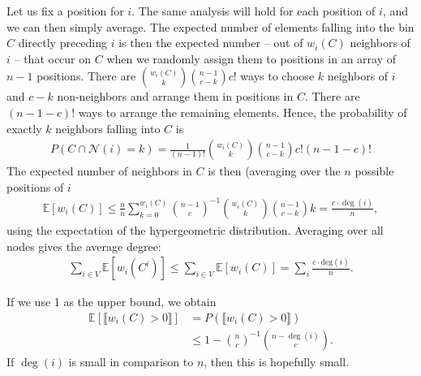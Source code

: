 \documentclass{article}
\newcommand{\inter}{\cap}
\begin{document}
Let us fix a position for $i$. The same analysis will hold for each position of $i$, and we can then simply average.
The expected number of elements falling into the bin $C$ directly preceding $i$ is then the expected number -- out of $w_i(C)$ neighbors of $i$ -- that occur on $C$ when we randomly assign them to positions in an array of $n-1$ positions.
There are ${ w_i(C) \choose k}{n-1 \choose c - k}c!$ ways to choose $k$ neighbors of $i$ and $c-k$ non-neighbors and arrange them in positions in $C$. There are $(n-1-c)!$ ways to arrange the remaining elements. Hence, the probability of exactly $k$ neighbors falling into $C$ is
\begin{align}
  P( C \inter \mathcal{N}(i) = k) = \frac{1}{(n-1)!}{ w_i(C) \choose k}{n-1 \choose c - k}c! (n-1-c)!
\end{align}
The expected number of neighbors in $C$ is then (averaging over the $n$ possible positions of $i$
\begin{align}
  \mathbb{E}[ w_i(C) ] \leq \frac{n}{n} \sum_{k=0}^{w_i(C)} {n-1 \choose c}^{-1}{ w_i(C) \choose k}{n-1 \choose c - k} k = \frac{c \cdot \deg(i)}{n},
\end{align}
using the expectation of the hypergeometric distribution.
Averaging over all nodes gives the average degree:
\begin{align*}
  \sum_{i \in V} \mathbb{E}[ w_i(C^i) ] \leq   \sum_{i \in V} \mathbb{E}[ w_i(C) ] = \sum_{i} \frac{c\cdot \mathrm{deg}(i)}{n}.
\end{align*}

If we use 1 as the upper bound, we obtain
\begin{align*}
  \mathbb{E}[ \llbracket w_i(C) > 0 \rrbracket ] &= P(  \llbracket w_i(C) > 0 \rrbracket ) \\
  &\leq 1 - {n \choose c}^{-1} {n-\deg(i) \choose c}.
\end{align*}
If $\deg(i)$ is small in comparison to $n$, then this is hopefully small.
\end{document}
